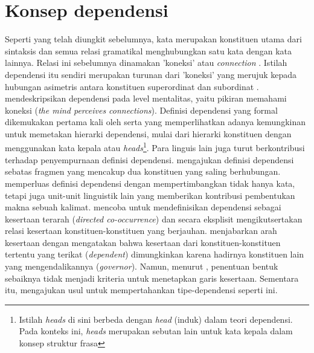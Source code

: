 \section{Konsep dependensi}
Seperti yang telah diungkit sebelumnya, kata merupakan konstituen utama dari sintaksis dan semua relasi gramatikal menghubungkan satu kata dengan kata lainnya. Relasi ini sebelumnya dinamakan 'koneksi' atau \textit{connection} \citep{tesniere1959elements}. Istilah dependensi itu sendiri merupakan turunan dari 'koneksi' yang merujuk kepada hubungan asimetris antara konstituen superordinat dan subordinat \citep{hudson1984word}. \cite{tesniere1959elements} mendeskripsikan dependensi pada level mentalitas, yaitu pikiran memahami koneksi (\textit{the mind perceives connections}). Definisi dependensi yang formal dikemukakan pertama kali oleh \cite{lecerf1960programme} serta \cite{gladkij1966lekcii} yang memperlihatkan adanya kemungkinan untuk memetakan hierarki dependensi, mulai dari hierarki konstituen dengan menggunakan kata kepala atau \textit{heads}\footnote{Istilah \textit{heads} di sini berbeda dengan \textit{head} (induk) dalam teori dependensi. Pada konteks ini, \textit{heads} merupakan sebutan lain untuk kata kepala dalam konsep struktur frasa}. Para linguis lain juga turut berkontribusi terhadap penyempurnaan definisi dependensi. \cite{mel'vcuk1988dependency} mengajukan definisi dependensi sebatas fragmen yang mencakup dua konstituen yang saling berhubungan. \cite{garde1977ordre} memperluas definisi dependensi dengan mempertimbangkan tidak hanya kata, tetapi juga unit-unit linguistik lain yang memberikan kontribusi pembentukan makna sebuah kalimat. \cite{schubert1987metataxis} mencoba untuk mendefinisikan dependensi sebagai kesertaan terarah (\textit{directed co-occurrence}) dan secara eksplisit mengikutsertakan relasi kesertaan konstituen-konstituen yang berjauhan. \cite{schubert1987metataxis} menjabarkan arah kesertaan dengan mengatakan bahwa kesertaan dari konstituen-konstituen tertentu yang terikat (\textit{dependent}) dimungkinkan karena hadirnya konstituen lain yang mengendalikannya (\textit{governor}). Namun, menurut \cite{schubert1987metataxis}, penentuan bentuk sebaiknya tidak menjadi kriteria untuk menetapkan garis kesertaan. Sementara itu, \cite{hudson1994discontinuous} mengajukan usul untuk mempertahankan \gls{tipe-dependensi} seperti ini.

